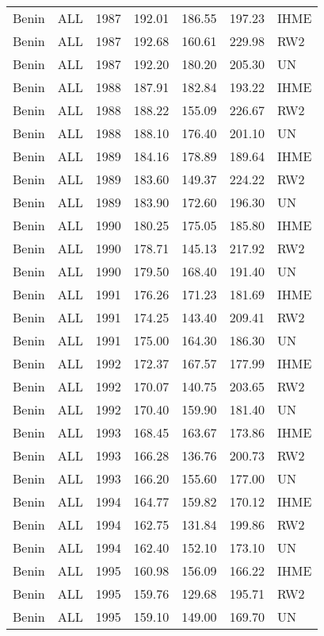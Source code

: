 \begin{longtable}{lllrrrl}
  Benin & ALL & 1987 & 192.01 & 186.55 & 197.23 & IHME \\ 
  Benin & ALL & 1987 & 192.68 & 160.61 & 229.98 & RW2 \\ 
  Benin & ALL & 1987 & 192.20 & 180.20 & 205.30 & UN \\ 
  Benin & ALL & 1988 & 187.91 & 182.84 & 193.22 & IHME \\ 
  Benin & ALL & 1988 & 188.22 & 155.09 & 226.67 & RW2 \\ 
  Benin & ALL & 1988 & 188.10 & 176.40 & 201.10 & UN \\ 
  Benin & ALL & 1989 & 184.16 & 178.89 & 189.64 & IHME \\ 
  Benin & ALL & 1989 & 183.60 & 149.37 & 224.22 & RW2 \\ 
  Benin & ALL & 1989 & 183.90 & 172.60 & 196.30 & UN \\ 
  Benin & ALL & 1990 & 180.25 & 175.05 & 185.80 & IHME \\ 
  Benin & ALL & 1990 & 178.71 & 145.13 & 217.92 & RW2 \\ 
  Benin & ALL & 1990 & 179.50 & 168.40 & 191.40 & UN \\ 
  Benin & ALL & 1991 & 176.26 & 171.23 & 181.69 & IHME \\ 
  Benin & ALL & 1991 & 174.25 & 143.40 & 209.41 & RW2 \\ 
  Benin & ALL & 1991 & 175.00 & 164.30 & 186.30 & UN \\ 
  Benin & ALL & 1992 & 172.37 & 167.57 & 177.99 & IHME \\ 
  Benin & ALL & 1992 & 170.07 & 140.75 & 203.65 & RW2 \\ 
  Benin & ALL & 1992 & 170.40 & 159.90 & 181.40 & UN \\ 
  Benin & ALL & 1993 & 168.45 & 163.67 & 173.86 & IHME \\ 
  Benin & ALL & 1993 & 166.28 & 136.76 & 200.73 & RW2 \\ 
  Benin & ALL & 1993 & 166.20 & 155.60 & 177.00 & UN \\ 
  Benin & ALL & 1994 & 164.77 & 159.82 & 170.12 & IHME \\ 
  Benin & ALL & 1994 & 162.75 & 131.84 & 199.86 & RW2 \\ 
  Benin & ALL & 1994 & 162.40 & 152.10 & 173.10 & UN \\ 
  Benin & ALL & 1995 & 160.98 & 156.09 & 166.22 & IHME \\ 
  Benin & ALL & 1995 & 159.76 & 129.68 & 195.71 & RW2 \\ 
  Benin & ALL & 1995 & 159.10 & 149.00 & 169.70 & UN \\ 

\end{longtable}
